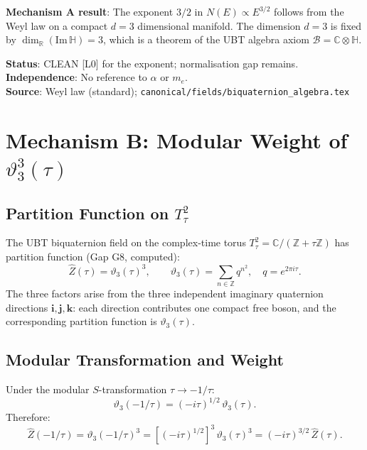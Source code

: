 \documentclass[12pt,a4paper]{article}
\theoremstyle{definition}
\theoremstyle{remark}
\begin{document}
\begin{resultbox}
\textbf{Mechanism A result}: The exponent $3/2$ in $N(E) \propto E^{3/2}$ follows
from the Weyl law on a compact $d=3$ dimensional manifold.  The dimension $d=3$
is fixed by $\dim_\mathbb{R}(\mathrm{Im}\,\mathbb{H}) = 3$, which is a theorem
of the UBT algebra axiom $\mathcal{B} = \mathbb{C}\otimes\mathbb{H}$.

\medskip
\textbf{Status}: CLEAN [L0] for the exponent; normalisation gap remains.\\
\textbf{Independence}: No reference to $\alpha$ or $m_e$.\\
\textbf{Source}: Weyl law (standard); \texttt{canonical/fields/biquaternion\_algebra.tex}
\end{resultbox}

\section{Mechanism B: Modular Weight of $\vartheta_3^3(\tau)$}
\label{sec:exp32:modular}

\subsection{Partition Function on $T^2_\tau$}
\label{ssec:exp32:mod:partition}

The UBT biquaternion field on the complex-time torus
$T^2_\tau = \mathbb{C}/(\mathbb{Z} + \tau\mathbb{Z})$
has partition function (Gap G8, computed):
\begin{equation}
  \hat{Z}(\tau) = \vartheta_3(\tau)^3,
  \qquad
  \vartheta_3(\tau) = \sum_{n \in \mathbb{Z}} q^{n^2},
  \quad q = e^{2\pi i\tau}.
  \label{eq:exp32:Zhat}
\end{equation}
The three factors arise from the three independent imaginary quaternion directions
$\mathbf{i}, \mathbf{j}, \mathbf{k}$: each direction contributes one compact free
boson, and the corresponding partition function is $\vartheta_3(\tau)$.

\subsection{Modular Transformation and Weight}
\label{ssec:exp32:mod:weight}

Under the modular $S$-transformation $\tau \to -1/\tau$:
\begin{equation}
  \vartheta_3(-1/\tau) = (-i\tau)^{1/2}\, \vartheta_3(\tau).
  \label{eq:exp32:theta3_S}
\end{equation}
Therefore:
\begin{equation}
  \hat{Z}(-1/\tau) = \vartheta_3(-1/\tau)^3
  = \left[(-i\tau)^{1/2}\right]^3\, \vartheta_3(\tau)^3
  = (-i\tau)^{3/2}\, \hat{Z}(\tau).
  \label{eq:exp32:Zhat_S}
\end{equation}
\end{document}
